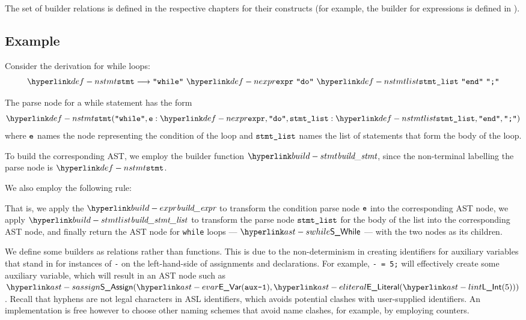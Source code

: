 The set of builder relations is defined in the respective chapters for their constructs
(for example, the builder for expressions is defined in ).

\subsection{Example}
Consider the derivation for while loops:
\[
\Nstmt \derives \Twhile \parsesep \Nexpr \parsesep \Tdo \parsesep \Nstmtlist \parsesep \Tend \parsesep \Tsemicolon
\]

The parse node for a while statement has the form
\[
\Nstmt(\Twhile, \namednode{\ve}{\Nexpr}, \Tdo, \namednode{\vstmtlist}{\Nstmtlist}, \Tend, \Tsemicolon)
\]
where $\ve$ names the node representing the condition of the loop and $\vstmtlist$ names
the list of statements that form the body of the loop.

To build the corresponding AST, we employ the builder function $\buildstmt$, since
the non-terminal labelling the parse node is $\Nstmt$.

We also employ the following rule:
\begin{mathpar}
\end{mathpar}
That is, we apply the $\buildexpr$ to transform the condition parse node $\ve$ into the corresponding AST node,
we apply $\buildstmtlist$ to transform the parse node $\vstmtlist$ for the body of the list into the corresponding AST node,
and finally return the AST node for \texttt{while} loops --- $\SWhile$ --- with the two nodes as its children.

We define some builders as relations rather than functions. This is due to the non-determinism
in creating identifiers for auxiliary variables that stand in for instances of \texttt{-} on the left-hand-side
of assignments and declarations.
For example, \texttt{- = 5;} will effectively create some auxiliary variable, which will result in
an AST node such as $\SAssign(\EVar(\texttt{aux-1}), \ELiteral(\lint(5)))$.
Recall that hyphens are not legal characters in ASL identifiers, which avoids potential clashes with
user-supplied identifiers. An implementation is free however to choose other naming schemes that
avoid name clashes, for example, by employing counters.

